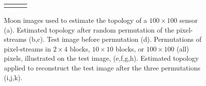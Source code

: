 \begin{figure}[t]
\begin{tabular}{ccc}
\vspace{3mm} \\
\end{tabular}
\caption{
Moon images used to estimate the topology of a $100 \times 100$ sensor (a).
Estimated topology after random permutation of the pixel-streams (b,c).
Test image before permutation (d).
Permutations of pixel-streams in $2 \times 4$ blocks, $10 \times 10$ blocks, or $100 \times 100$ (all) pixels, illustrated on the test image, (e,f,g,h).
Estimated topology applied to reconstruct the test image after the three permutations (i,j,k).
}
\label{fig:results2}
\end{figure}
